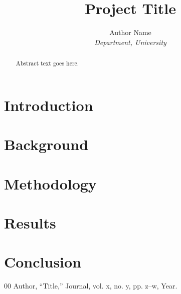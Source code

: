 \documentclass[10pt,journal]{IEEEtran}
\begin{document}
\title{Project Title}
\author{
    Author Name\\
    \textit{Department, University}\\
}
\maketitle
{}

\begin{abstract}
Abstract text goes here.
\end{abstract}

\section{Introduction}

\section{Background}

\section{Methodology}

\section{Results}

\section{Conclusion}

\begin{thebibliography}{00}
     Author, ``Title,'' Journal, vol. x, no. y, pp. z--w, Year.
\end{thebibliography}
\end{document}
